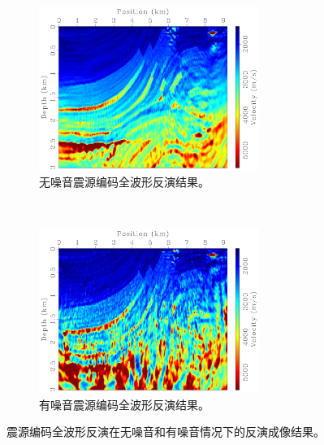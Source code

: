 \documentclass[degree=doctor]{thuthesis}
\begin{document}
\begin{figure}[ht]
    \begin{subfigure}[b]{0.5\textwidth}
        \centering
        \includegraphics[height=2.1in]{esfwi.pdf}
        \caption{无噪音震源编码全波形反演结果。}
        \label{fig:无噪音震源编码全波形反演结果}
    \end{subfigure}%
    ~
    \begin{subfigure}[b]{0.5\textwidth}
        \centering
        \includegraphics[height=2.1in]{esfwi-noise.pdf}
        \caption{有噪音震源编码全波形反演结果。}
        \label{fig:有噪音震源编码全波形反演结果}
    \end{subfigure}
    \caption{震源编码全波形反演在无噪音和有噪音情况下的反演成像结果。}
\end{figure}
\end{document}
